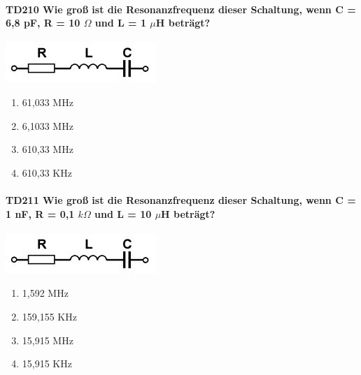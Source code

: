 \documentclass[8pt]{article}
\begin{document}
\begin{enumerate}
\begin{enumerate}[nolistsep,label=\Alph*]
{\paragraph*{TD210 Wie groß ist die Resonanzfrequenz dieser Schaltung, wenn C = 6,8 pF, R = 10 $\Omega$ und L = 1 $\mu$H beträgt?}
\begin{center}
	\begin{minipage}{\linewidth}
		\centering
		\includegraphics[scale=1.0]{pics/td210_a.jpg}
	\end{minipage}
\end{center}
\begin{enumerate}[nolistsep,label=\Alph*]
\item 61,033 MHz
\item 6,1033 MHz
\item 610,33 MHz
\item 610,33 KHz
\end{enumerate}

\paragraph*{TD211 Wie groß ist die Resonanzfrequenz dieser Schaltung, wenn C = 1 nF, R = 0,1 $k\Omega$ und L = 10 $\mu$H beträgt?}
\begin{center}
	\begin{minipage}{\linewidth}
		\centering
		\includegraphics[scale=1.0]{pics/td211_a.jpg}
	\end{minipage}
\end{center}
\begin{enumerate}[nolistsep,label=\Alph*]
\item 1,592 MHz
\item 159,155 KHz
\item 15,915 MHz
\item 15,915 KHz
\end{enumerate}

}
\end{enumerate}
\end{enumerate}
\end{document}
